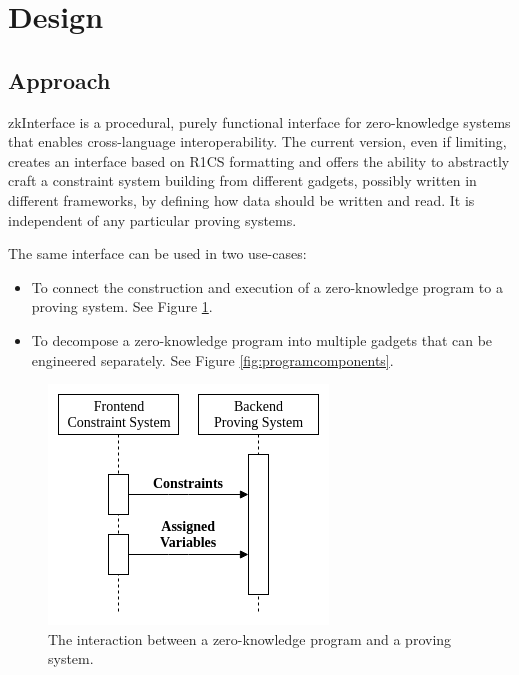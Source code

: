 \section{Design}
\label{sec:design}

\subsection{Approach}

	zkInterface is a procedural, purely functional interface for zero-knowledge systems that enables cross-language interoperability. The current version, even if limiting, creates an interface based on R1CS formatting and offers the ability to abstractly craft a constraint system building from different gadgets, possibly written in different frameworks, by defining how data should be written and read.
	It is independent of any particular proving systems.

	The same interface can be used in two use-cases:
	\begin{itemize}
		\item To connect the construction and execution of a zero-knowledge program
			to a proving system. See Figure \ref{fig:programproving}.

		\item To decompose a zero-knowledge program into multiple gadgets that can be engineered separately. See Figure \ref{fig:programcomponents}.
	\end{itemize}
	
\begin{figure}[!h]
	\centering
	\includegraphics[width=0.5\linewidth]{graphics/program_proving.png}
	\caption{The interaction between a zero-knowledge program and a proving system.}
	\label{fig:programproving}
\end{figure}

